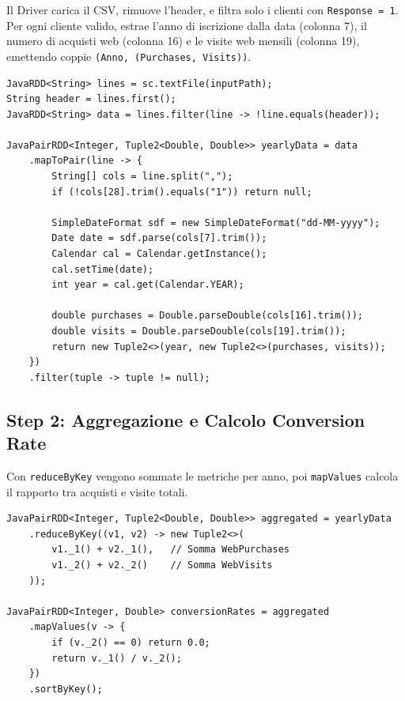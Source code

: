 \documentclass[a4paper, 12pt, oneside]{report}
\begin{document}
Il Driver carica il CSV, rimuove l'header, e filtra solo i clienti con \texttt{Response = 1}. Per ogni cliente valido, estrae l'anno di iscrizione dalla data (colonna 7), il numero di acquisti web (colonna 16) e le visite web mensili (colonna 19), emettendo coppie \texttt{(Anno, (Purchases, Visits))}.

\begin{lstlisting}[caption=Caricamento e filtraggio]
JavaRDD<String> lines = sc.textFile(inputPath);
String header = lines.first();
JavaRDD<String> data = lines.filter(line -> !line.equals(header));

JavaPairRDD<Integer, Tuple2<Double, Double>> yearlyData = data
    .mapToPair(line -> {
        String[] cols = line.split(",");
        if (!cols[28].trim().equals("1")) return null;
        
        SimpleDateFormat sdf = new SimpleDateFormat("dd-MM-yyyy");
        Date date = sdf.parse(cols[7].trim());
        Calendar cal = Calendar.getInstance();
        cal.setTime(date);
        int year = cal.get(Calendar.YEAR);
        
        double purchases = Double.parseDouble(cols[16].trim());
        double visits = Double.parseDouble(cols[19].trim());
        return new Tuple2<>(year, new Tuple2<>(purchases, visits));
    })
    .filter(tuple -> tuple != null);
\end{lstlisting}

\subsection{Step 2: Aggregazione e Calcolo Conversion Rate}

Con \texttt{reduceByKey} vengono sommate le metriche per anno, poi \texttt{mapValues} calcola il rapporto tra acquisti e visite totali.

\begin{lstlisting}[caption=Aggregazione e calcolo]
JavaPairRDD<Integer, Tuple2<Double, Double>> aggregated = yearlyData
    .reduceByKey((v1, v2) -> new Tuple2<>(
        v1._1() + v2._1(),   // Somma WebPurchases
        v1._2() + v2._2()    // Somma WebVisits
    ));

JavaPairRDD<Integer, Double> conversionRates = aggregated
    .mapValues(v -> {
        if (v._2() == 0) return 0.0;
        return v._1() / v._2();
    })
    .sortByKey();
\end{lstlisting}

\end{document}
